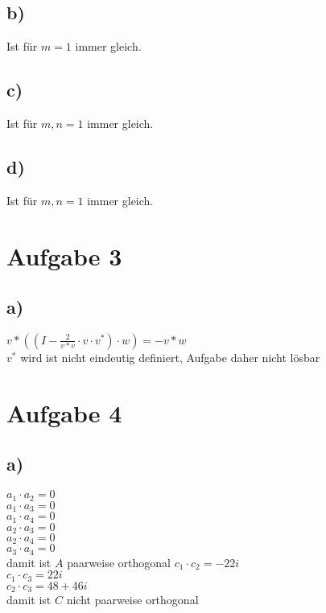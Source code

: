 \documentclass[10pt,a4paper]{article}
\begin{document}
\subsection*{b)}
Ist für $m=1$ immer gleich.

\subsection*{c)}
Ist für $m,n=1$ immer gleich.

\subsection*{d)}
Ist für $m,n=1$ immer gleich.

\section*{Aufgabe 3}
\subsection*{a)}
$ v * ((I - \frac{2}{v*v} \cdot v \cdot v^*)\cdot w) = -v * w$\\
$v^*$ wird ist nicht eindeutig definiert, Aufgabe daher nicht lösbar

\section*{Aufgabe 4}
\subsection*{a)}
$a_1 \cdot a_2 = 0$\\
$a_1 \cdot a_3 = 0$\\
$a_1 \cdot a_4 = 0$\\
$a_2 \cdot a_3 = 0$\\
$a_2 \cdot a_4 = 0$\\
$a_3 \cdot a_4 = 0$\\
damit ist $A$ paarweise orthogonal
$c_1 \cdot c_2 = -22i$\\
$c_1 \cdot c_3 = 22i$\\
$c_2 \cdot c_3 = 48+46i$\\
damit ist $C$ nicht paarweise orthogonal
\end{document}
